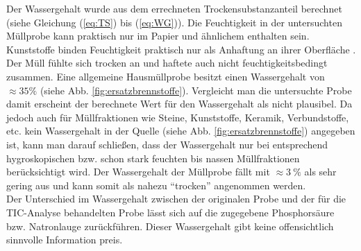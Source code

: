 Der Wassergehalt wurde aus dem errechneten Trockensubstanzanteil berechnet (siehe Gleichung (\ref{eq:TS}) bis (\ref{eq:WG})).
Die Feuchtigkeit in der untersuchten Müllprobe kann praktisch nur im Papier und ähnlichem enthalten sein. Kunststoffe binden Feuchtigkeit praktisch nur als Anhaftung an ihrer Oberfläche \cite[S.3]{LLA_Abfallanalyse}. Der Müll fühlte sich trocken an und haftete auch nicht feuchtigkeitsbedingt zusammen.
Eine allgemeine Hausmüllprobe besitzt einen Wassergehalt von $\approx 35\%$  (siehe Abb. \ref{fig:ersatzbrennstoffe}). Vergleicht man die untersuchte Probe damit erscheint der berechnete Wert für den Wassergehalt als nicht plausibel. Da jedoch auch für Müllfraktionen wie Steine, Kunststoffe, Keramik, Verbundstoffe, etc. kein Wassergehalt in der Quelle (siehe Abb. \ref{fig:ersatzbrennstoffe}) angegeben ist, kann man darauf schließen, dass der Wassergehalt nur bei entsprechend hygroskopischen bzw. schon stark feuchten bis nassen Müllfraktionen berücksichtigt wird. Der Wassergehalt der Müllprobe fällt mit $\approx \SI{3}{\percent}$ als sehr gering aus und kann somit als nahezu "`trocken"' angenommen werden.\\
Der Unterschied im Wassergehalt zwischen der originalen Probe und der für die TIC-Analyse behandelten Probe lässt sich auf die zugegebene Phosphorsäure bzw. Natronlauge zurückführen. Dieser Wassergehalt gibt keine offensichtlich sinnvolle Information preis.


